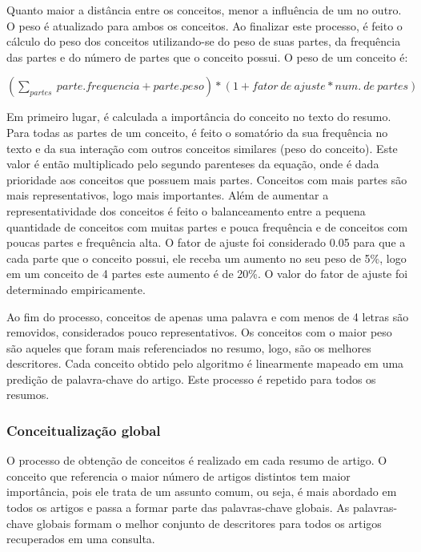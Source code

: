 Quanto maior a distância entre os conceitos, menor a influência de um no outro. O peso é atualizado para ambos os conceitos. Ao finalizar este processo, é feito o cálculo do peso dos conceitos utilizando-se do peso de suas partes, da frequência das partes e do número de partes que o conceito possui. O peso de um conceito é:

\(
\left(\sum_{partes}\medspace parte.frequencia + parte.peso\right) * \left(1 + fator\medspace de\medspace ajuste * num.\medspace de\medspace partes\right)
\)

Em primeiro lugar, é calculada a importância do conceito no texto do resumo. Para todas as partes de um conceito, é feito o somatório da sua frequência no texto e da sua interação com outros conceitos similares (peso do conceito). Este valor é então multiplicado pelo segundo parenteses da equação, onde é dada prioridade aos conceitos que possuem mais partes. Conceitos com mais partes são mais representativos, logo mais importantes. Além de aumentar a representatividade dos conceitos é feito o balanceamento entre a pequena quantidade de conceitos com muitas partes e pouca frequência e de conceitos com poucas partes e frequência alta. O fator de ajuste foi considerado 0.05 para que a cada parte que o conceito possui, ele receba um aumento no seu peso de 5\%, logo em um conceito de 4 partes este aumento é de 20\%. O valor do fator de ajuste foi determinado empiricamente.

Ao fim do processo, conceitos de apenas uma palavra e com menos de 4 letras são removidos, considerados pouco representativos.
Os conceitos com o maior peso são aqueles que foram mais referenciados no resumo, logo, são os melhores descritores. Cada conceito obtido pelo algoritmo é linearmente mapeado em uma predição de palavra-chave do artigo. Este processo é repetido para todos os resumos.

\subsubsection{Conceitualização global}

O processo de obtenção de conceitos é realizado em cada resumo de artigo. O conceito que referencia o maior número de artigos distintos tem maior importância, pois ele trata de um assunto comum, ou seja, é mais abordado em todos os artigos e passa a formar parte das palavras-chave globais. As palavras-chave globais formam o melhor conjunto de descritores para todos os artigos recuperados em uma consulta.


